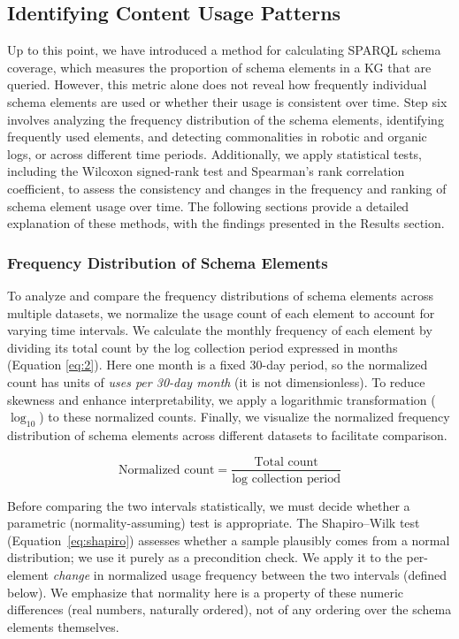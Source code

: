 \documentclass[sw]{iosart2x}
\begin{document}
\subsection{Identifying Content Usage Patterns}\label{sec:s6}
Up to this point, we have introduced a method for calculating SPARQL schema coverage, which measures the proportion of schema elements in a KG that are queried. However, this metric alone does not reveal how frequently individual schema elements are used or whether their usage is consistent over time. Step six involves analyzing the frequency distribution of the schema elements, identifying frequently used elements, and detecting commonalities in robotic and organic logs, or across different time periods. Additionally, we apply statistical tests, including the Wilcoxon signed-rank test and Spearman's rank correlation coefficient, to assess the consistency and changes in the frequency and ranking of schema element usage over time. The following sections provide a detailed explanation of these methods, with the findings presented in the Results section.

\subsubsection{Frequency Distribution of Schema Elements}\label{sec:s61}
To analyze and compare the frequency distributions of schema elements across multiple datasets, we normalize the usage count of each element to account for varying time intervals. We calculate the monthly frequency of each element by dividing its total count by the log collection period expressed in months (Equation \ref{eq:2}). Here one month is a fixed 30-day period, so the normalized count has units of \emph{uses per 30-day month} (it is not dimensionless). To reduce skewness and enhance interpretability, we apply a logarithmic transformation ($\log_{10}$) to these normalized counts. Finally, we visualize the normalized frequency distribution of schema elements across different datasets to facilitate comparison.

\begin{equation}
\text{Normalized count} = \frac{\text{Total count}}{\text{log collection period}}
\label{eq:2}
\end{equation}

Before comparing the two intervals statistically, we must decide whether a parametric (normality-assuming) test is appropriate. The Shapiro--Wilk test (Equation~\ref{eq:shapiro}) assesses whether a sample plausibly comes from a normal distribution; we use it purely as a precondition check. We apply it to the per-element \emph{change} in normalized usage frequency between the two intervals (defined below). We emphasize that normality here is a property of these numeric differences (real numbers, naturally ordered), not of any ordering over the schema elements themselves.
\end{document}
